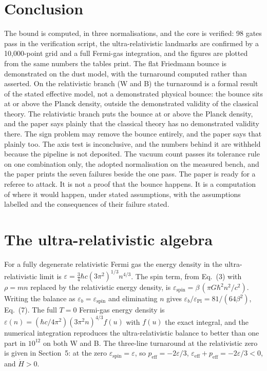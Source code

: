 \documentclass[11pt]{article}
\newcommand{\epsPl}{\varepsilon_{\mathrm{Pl}}}
\begin{document}
\section{Conclusion}

The bound is computed, in three normalisations, and the core is
verified: 98 gates pass in the verification script, the
ultra-relativistic landmarks are confirmed by a 10,000-point grid and a
full Fermi-gas integration, and the figures are plotted from the same
numbers the tables print. The flat Friedmann bounce is demonstrated on
the dust model, with the turnaround computed rather than asserted. On the
relativistic branch (W and B) the turnaround is a formal result of the stated
effective model, not a demonstrated physical bounce: the bounce sits at or
above the Planck density, outside the demonstrated validity of the classical
theory. The relativistic branch puts the bounce
at or above the Planck density, and the paper says plainly that the
classical theory has no demonstrated validity there. The sign problem
may remove the bounce entirely, and the paper says that plainly too. The
axis test is inconclusive, and the numbers behind it are withheld
because the pipeline is not deposited. The vacuum count passes its
tolerance rule on one combination only, the adopted normalisation on the
measured bench, and the paper prints the seven failures beside the one
pass. The paper is ready for a referee to attack. It is not a proof
that the bounce happens. It is a computation of where it would happen,
under stated assumptions, with the assumptions labelled and the
consequences of their failure stated.

\appendix
\section{The ultra-relativistic algebra}

For a fully degenerate relativistic Fermi gas the energy density in the
ultra-relativistic limit is $\varepsilon = \tfrac34\hbar c(3\pi^2)^{1/3}
n^{4/3}$. The spin term, from Eq.~(3) with $\rho = mn$ replaced by the
relativistic energy density, is $\varepsilon_{\mathrm{spin}} = \beta\,
(\pi G\hbar^2 n^2/c^2)$. Writing the balance as
$\varepsilon_b = \varepsilon_{\mathrm{spin}}$ and eliminating $n$ gives
$\varepsilon_b/\epsPl = 81/(64\beta^2)$, Eq.~(7). The full $T = 0$
Fermi-gas energy density is $\varepsilon(n) = (\hbar c/4\pi^2)
(3\pi^2 n)^{4/3} f(u)$ with $f(u)$ the exact integral, and the numerical
integration reproduces the ultra-relativistic balance to better than one
part in $10^{12}$ on both W and B. The three-line turnaround at the
relativistic zero is given in Section~5: at the zero
$\varepsilon_{\mathrm{spin}} = \varepsilon$, so $p_{\mathrm{eff}} =
-2\varepsilon/3$, $\varepsilon_{\mathrm{eff}} + p_{\mathrm{eff}} =
-2\varepsilon/3 < 0$, and $\dot H > 0$.
\end{document}
